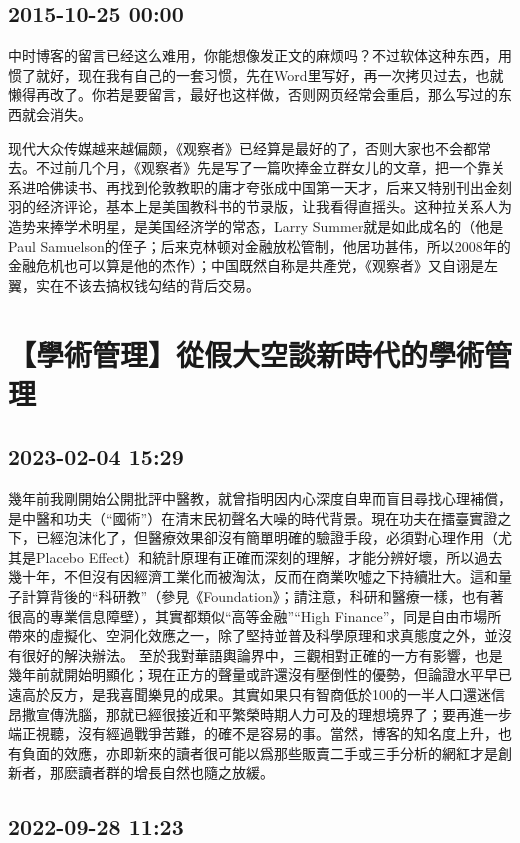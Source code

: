 \documentclass[twocolumn]{ctexart}
\begin{document}
\subsection*{2015-10-25 00:00}
中时博客的留言已经这么难用，你能想像发正文的麻烦吗？不过软体这种东西，用惯了就好，现在我有自己的一套习惯，先在Word里写好，再一次拷贝过去，也就懒得再改了。你若是要留言，最好也这样做，否则网页经常会重启，那么写过的东西就会消失。

现代大众传媒越来越偏颇，《观察者》已经算是最好的了，否则大家也不会都常去。不过前几个月，《观察者》先是写了一篇吹捧金立群女儿的文章，把一个靠关系进哈佛读书、再找到伦敦教职的庸才夸张成中国第一天才，后来又特别刊出金刻羽的经济评论，基本上是美国教科书的节录版，让我看得直摇头。这种拉关系人为造势来捧学术明星，是美国经济学的常态，Larry Summer就是如此成名的（他是Paul Samuelson的侄子；后来克林顿对金融放松管制，他居功甚伟，所以2008年的金融危机也可以算是他的杰作）；中国既然自称是共產党，《观察者》又自诩是左翼，实在不该去搞权钱勾结的背后交易。\section*{【學術管理】從假大空談新時代的學術管理}
\subsection*{2023-02-04 15:29}

幾年前我剛開始公開批評中醫教，就曾指明因内心深度自卑而盲目尋找心理補償，是中醫和功夫（“國術”）在清末民初聲名大噪的時代背景。現在功夫在擂臺實證之下，已經泡沫化了，但醫療效果卻沒有簡單明確的驗證手段，必須對心理作用（尤其是Placebo Effect）和統計原理有正確而深刻的理解，才能分辨好壞，所以過去幾十年，不但沒有因經濟工業化而被淘汰，反而在商業吹噓之下持續壯大。這和量子計算背後的“科研教”（參見《Foundation》；請注意，科研和醫療一樣，也有著很高的專業信息障壁），其實都類似“高等金融”“High Finance”，同是自由市場所帶來的虛擬化、空洞化效應之一，除了堅持並普及科學原理和求真態度之外，並沒有很好的解決辦法。
至於我對華語輿論界中，三觀相對正確的一方有影響，也是幾年前就開始明顯化；現在正方的聲量或許還沒有壓倒性的優勢，但論證水平早已遠高於反方，是我喜聞樂見的成果。其實如果只有智商低於100的一半人口還迷信昂撒宣傳洗腦，那就已經很接近和平繁榮時期人力可及的理想境界了；要再進一步端正視聽，沒有經過戰爭苦難，的確不是容易的事。當然，博客的知名度上升，也有負面的效應，亦即新來的讀者很可能以爲那些販賣二手或三手分析的網紅才是創新者，那麽讀者群的增長自然也隨之放緩。
\subsection*{2022-09-28 11:23}
\end{document}
